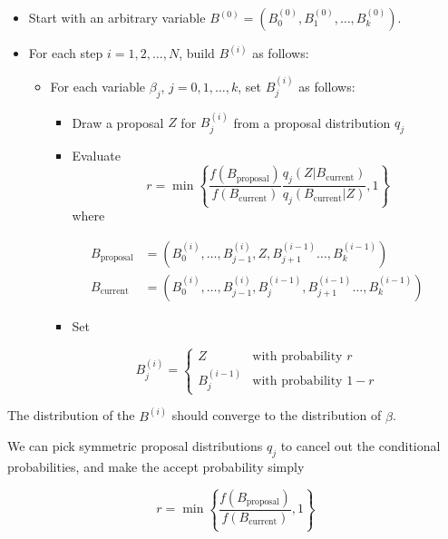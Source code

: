 \begin{itemize}[tightlist]
\item
  Start with an arbitrary variable
  \(B^{(0)} = (B^{(0)}_0, B^{(0)}_1, \dots, B^{(0)}_k)\).
\item
  For each step \(i = 1, 2, \dots, N\), build \(B^{(i)}\) as follows:

  \begin{itemize}
  \item
    For each variable \(\beta_j\), \(j = 0, 1, \dots, k\), set
\(B_j^{(i)}\) as follows:

    \begin{itemize}[tightlist]
    \item
      Draw a proposal \(Z\) for \(B_j^{(i)}\) from a proposal
      distribution \(q_{j}\)
    \item
      Evaluate
      \[ r = \min \left\{ \frac{f\left(B_\text{proposal}\right)}{f\left(B_\text{current}\right)} \frac{q_{j}(Z | B_\text{current})}{q_{j}(B_\text{current} | Z)}, 1\right\} \]
      where
    \end{itemize}

    \[
     \begin{align}
     B_\text{proposal} &= \left(B_0^{(i)}, \dots, B_{j-1}^{(i)}, Z, B_{j + 1}^{(i - 1)} \dots, B_k^{(i - 1)}\right) \\
     B_\text{current} &= \left(B_0^{(i)}, \dots, B_{j-1}^{(i)}, B_{j}^{(i - 1)}, B_{j + 1}^{(i - 1)} \dots, B_k^{(i - 1)}\right)
     \end{align}
     \]

    \begin{itemize}[tightlist]
    \item
      Set
    \end{itemize}

    \[ 
     B_j^{(i)} = \begin{cases}
     Z &\text{with probability } r \\
     B_j^{(i - 1)} &\text{with probability } 1 - r
     \end{cases}
     \]
  \end{itemize}
\end{itemize}

The distribution of the \(B^{(i)}\) should converge to the distribution
of \(\beta\).

We can pick symmetric proposal distributions \(q_{j}\) to cancel out the
conditional probabilities, and make the accept probability simply

\[ r = \min \left\{ \frac{f\left(B_\text{proposal}\right)}{f\left(B_\text{current}\right)}, 1\right\} \]

